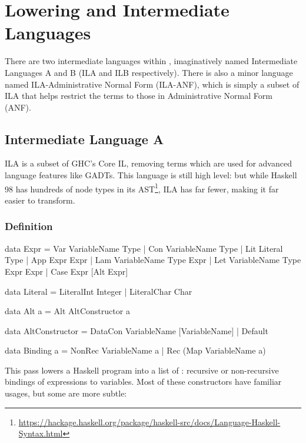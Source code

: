 \documentclass[dissertation.tex]{subfiles}
\begin{document}
\section{Lowering and Intermediate Languages}
{
    There are two intermediate languages within \compilername, imaginatively named Intermediate Languages A and B (ILA and ILB respectively). There is also a minor language named ILA-Administrative Normal Form (ILA-ANF), which is simply a subset of ILA that helps restrict the terms to those in Administrative Normal Form (ANF).

    \subsection{Intermediate Language A}
    {
        ILA is a subset of GHC's Core IL, removing terms which are used for advanced language features like GADTs. This language is still high level: but while Haskell 98 has hundreds of node types in its AST\footnote{\url{https://hackage.haskell.org/package/haskell-src/docs/Language-Haskell-Syntax.html}}, ILA has far fewer, making it far easier to transform.

        \subsubsection{Definition}
        {
            \begin{haskellfigure}
            data Expr = Var VariableName Type
                      | Con VariableName Type
                      | Lit Literal Type
                      | App Expr Expr
                      | Lam VariableName Type Expr
                      | Let VariableName Type Expr Expr
                      | Case Expr [Alt Expr]

            data Literal = LiteralInt Integer
                         | LiteralChar Char

            data Alt a = Alt AltConstructor a

            data AltConstructor = DataCon VariableName [VariableName]
                                | Default

            data Binding a = NonRec VariableName a
                           | Rec (Map VariableName a)
            \end{haskellfigure}

            This pass lowers a Haskell program into a list of : recursive or non-recursive bindings of expressions to variables. Most of these constructors have familiar usages, but some are more subtle:

}}}
\end{document}

